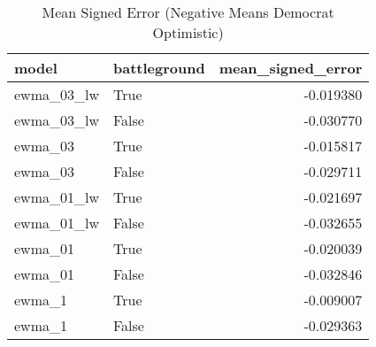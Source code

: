 \begin{table}
\centering
\caption{Mean Signed Error
(Negative Means Democrat Optimistic)}
\begin{tabular}{llr}
\toprule
      model &  battleground &  mean\_signed\_error \\
\midrule
 ewma\_03\_lw &          True &          -0.019380 \\
 ewma\_03\_lw &         False &          -0.030770 \\
    ewma\_03 &          True &          -0.015817 \\
    ewma\_03 &         False &          -0.029711 \\
 ewma\_01\_lw &          True &          -0.021697 \\
 ewma\_01\_lw &         False &          -0.032655 \\
    ewma\_01 &          True &          -0.020039 \\
    ewma\_01 &         False &          -0.032846 \\
     ewma\_1 &          True &          -0.009007 \\
     ewma\_1 &         False &          -0.029363 \\
\bottomrule
\end{tabular}
\end{table}
